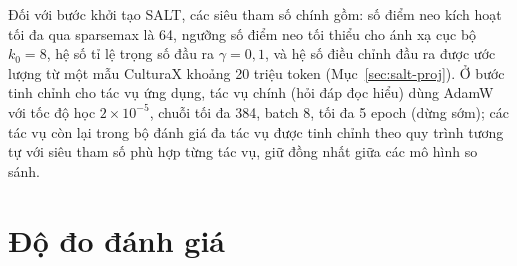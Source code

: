 \begin{table}[ht]
  \caption{Siêu tham số huấn luyện.}
  \label{tab:hyperparams}
  \centering
  \small
\end{table}

Đối với bước khởi tạo SALT, các siêu tham số chính gồm: số điểm neo kích hoạt tối đa qua
sparsemax là 64, ngưỡng số điểm neo tối thiểu cho ánh xạ cục bộ $k_0 = 8$, hệ số tỉ lệ trọng số
đầu ra $\gamma = 0{,}1$, và hệ số điều chỉnh đầu ra được ước lượng từ một mẫu CulturaX
khoảng 20 triệu token (Mục~\ref{sec:salt-proj}). Ở bước tinh chỉnh cho tác vụ ứng dụng, tác vụ
chính (hỏi đáp đọc hiểu) dùng AdamW với tốc độ học $2\times10^{-5}$, chuỗi tối đa 384,
batch 8, tối đa 5 epoch (dừng sớm); các tác vụ còn lại trong bộ đánh giá đa tác vụ được
tinh chỉnh theo quy trình tương tự với siêu tham số phù hợp từng tác vụ, giữ đồng nhất
giữa các mô hình so sánh.

\section{Độ đo đánh giá}
\label{sec:exp-metrics}

